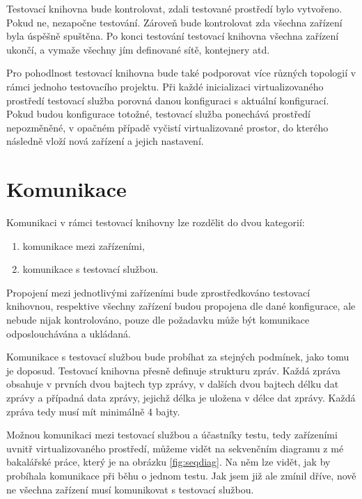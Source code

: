 Testovací knihovna bude kontrolovat, zdali testované prostředí bylo vytvořeno. Pokud ne, nezapočne testování. Zároveň bude kontrolovat zda všechna zařízení byla úspěšně spuštěna. Po konci testování testovací knihovna všechna zařízení ukončí, a vymaže všechny jím definované sítě, kontejnery atd.

Pro pohodlnost testovací knihovna bude také podporovat více různých topologií v rámci jednoho testovacího projektu. Při každé inicializaci virtualizovaného prostředí testovací služba porovná danou konfiguraci s aktuální konfigurací. Pokud budou konfigurace totožné, testovací služba ponechává prostředí nepozměněné, v opačném případě vyčistí virtualizované prostor, do kterého následně vloží nová zařízení a jejich nastavení.  


\section{Komunikace}

Komunikaci v rámci testovací knihovny lze rozdělit do dvou kategorií:

\begin{enumerate}
    \item komunikace mezi zařízeními,
    \item komunikace s testovací službou.
\end{enumerate}

Propojení mezi jednotlivými zařízeními bude zprostředkováno testovací knihovnou, respektive všechny zařízení budou propojena dle dané konfigurace, ale nebude nijak kontrolováno, pouze dle požadavku může být komunikace odposlouchávána a ukládaná. 

Komunikace s testovací službou bude probíhat za stejných podmínek, jako tomu je doposud. Testovací knihovna přesně definuje strukturu zpráv. Každá zpráva obsahuje v prvních dvou bajtech typ zprávy, v dalších dvou bajtech délku dat zprávy a případná data zprávy, jejichž délka je uložena v délce dat zprávy. Každá zpráva tedy musí mít minimálně 4 bajty. 

Možnou komunikaci mezi testovací službou a účastníky testu, tedy zařízeními uvnitř virtualizovaného prostředí, můžeme vidět na sekvenčním diagramu z mé bakalářské práce\cite{bakalarka}, který je na obrázku \ref{fig:seqdiag}. Na něm lze vidět, jak by probíhala komunikace při běhu o jednom testu. Jak jsem již ale zmínil dříve, nově ne všechna zařízení musí komunikovat s testovací službou. 

